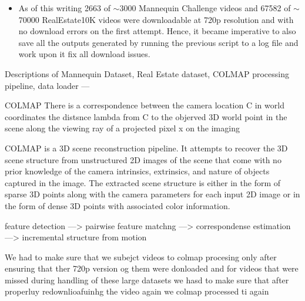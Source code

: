 \begin{itemize}
    \item As of this writing 2663 of $\sim$3000 Mannequin Challenge videos and 67582 of $\sim$70000 RealEstate10K videos were downloadable at 720p resolution and with no download errors on the first attempt. Hence, it became imperative to also save all the outputs generated by running the previous script to a log file and work upon it fix all download issues.
\end{itemize}

Descriptions of Mannequin Dataset, Real Estate dataset, COLMAP processing pipeline, data loader ---

COLMAP
There is a correspondence between the camera location C in world coordinates the distsnce lambda from C to the objerved 3D world point in the scene along the viewing ray of a projected pixel x on the imaging 

COLMAP is a 3D scene reconstruction pipeline. It attempts to recover the 3D scene structure from unstructured 2D images of the scene that come with no prior knowledge of the camera intrinsics, extrinsics, and nature of objects captured in the image. 
The extracted scene structure is either in the form of sparse 3D points along with the camera parameters for each input 2D image or in the form of dense 3D points with associated color information.

feature detection ---> pairwise feature matchng ---> correspondense estimation ---> incremental structure from motion

We had to make sure that we subejct videos to colmap procesing only after ensuring that ther 720p version og them were donloaded and for videos that were missed during handling of these large datasets we hasd to make sure that after properluy redownlioafuinhg the video again we colmap processed ti again 




